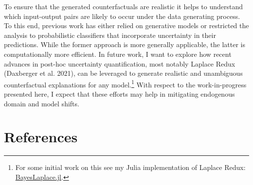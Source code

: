 \documentclass[
  sigconf]{acmart}
\begin{document}
To ensure that the generated counterfactuals are realistic it helps to
understand which input-output pairs are likely to occur under the data
generating process. To this end, previous work has either relied on
generative models or restricted the analysis to probabilistic
classifiers that incorporate uncertainty in their predictions. While the
former approach is more generally applicable, the latter is
computationally more efficient. In future work, I want to explore how
recent advances in post-hoc uncertainty quantification, most notably
Laplace Redux (Daxberger et al. 2021), can be leveraged to generate
realistic and unambiguous counterfactual explanations for any
model.\footnote{For some initial work on this see my Julia
  implementation of Laplace Redux:
  \href{https://www.paltmeyer.com/BayesLaplace.jl/dev/}{BayesLaplace.jl}.}
With respect to the work-in-progress presented here, I expect that these
efforts may help in mitigating endogenous domain and model shifts.

\hypertarget{references}{%
\section*{References}\label{references}}
\end{document}
